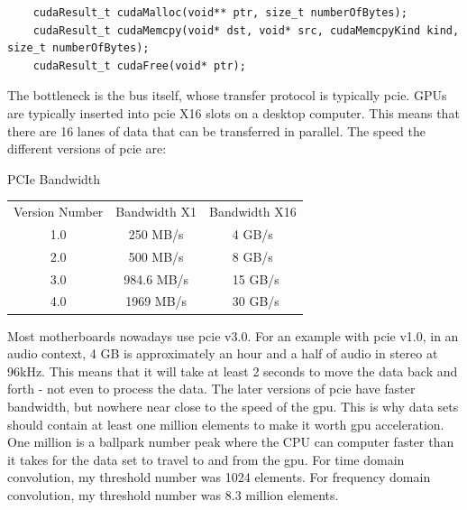 \begin{verbatim}
    cudaResult_t cudaMalloc(void** ptr, size_t numberOfBytes);
    cudaResult_t cudaMemcpy(void* dst, void* src, cudaMemcpyKind kind, size_t numberOfBytes);
    cudaResult_t cudaFree(void* ptr);
\end{verbatim}

The bottleneck is the bus itself, whose transfer protocol is typically \gls{pcie}. GPUs are typically inserted into \gls{pcie} X16 slots on a desktop computer. This means that there are 16 lanes of data that can be transferred in parallel. The speed the different versions of \gls{pcie} are:
\begin{center}
PCIe Bandwidth
\begin{tabular}{ c c c}
Version Number & Bandwidth X1 & Bandwidth X16 \\
1.0 & 250 MB/s & 4 GB/s \\
2.0 & 500 MB/s & 8 GB/s \\
3.0 & 984.6 MB/s & ~15 GB/s \\
4.0 & 1969 MB/s & ~30 GB/s 
\end{tabular}

\citep{pci-sig}
\end{center}
Most motherboards nowadays use \gls{pcie} v3.0. For an example with \gls{pcie} v1.0, in an audio context, 4 GB is approximately an hour and a half of audio in stereo at 96kHz. This means that it will take at least 2 seconds to move the data back and forth - not even to process the data. The later versions of \gls{pcie} have faster bandwidth, but nowhere near close to the speed of the \gls{gpu}. This is why data sets should contain at least one million elements to make it worth \gls{gpu} acceleration. One million is a ballpark number peak where the CPU can computer faster than it takes for the data set to travel to and from the \gls{gpu}. For time domain convolution, my threshold number was 1024 elements. For frequency domain convolution, my threshold number was 8.3 million elements.

